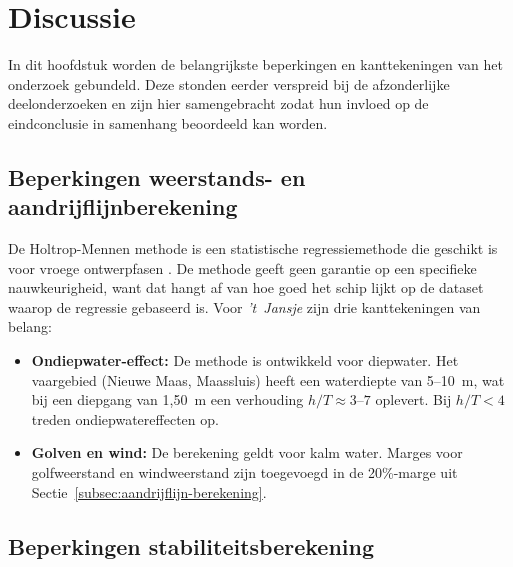 \chapter{Discussie}
\label{ch:discussie}

\noindent In dit hoofdstuk worden de belangrijkste beperkingen en kanttekeningen
van het onderzoek gebundeld. Deze stonden eerder verspreid bij de afzonderlijke
deelonderzoeken en zijn hier samengebracht zodat hun invloed op de eindconclusie
in samenhang beoordeeld kan worden.

\section{Beperkingen weerstands- en aandrijflijnberekening}
\label{subsec:holtrop-validatie}

De Holtrop-Mennen methode is een statistische regressiemethode die
geschikt is voor vroege ontwerpfasen \cite{Holtrop1984}. De methode
geeft geen garantie op een specifieke nauwkeurigheid, want dat hangt
af van hoe goed het schip lijkt op de dataset waarop de regressie
gebaseerd is. Voor \emph{'t~Jansje} zijn drie kanttekeningen van belang:

\begin{itemize}

    \item \textbf{Ondiepwater-effect:} De methode is ontwikkeld voor diepwater.
          Het vaargebied (Nieuwe Maas, Maassluis) heeft een waterdiepte van
          5--10~m, wat bij een diepgang van 1{,}50~m een verhouding
          $h/T \approx 3$--$7$ oplevert. Bij $h/T < 4$ treden
          ondiepwatereffecten op.

    \item \textbf{Golven en wind:} De berekening geldt voor kalm water. Marges
          voor golfweerstand en windweerstand zijn toegevoegd in de
          20\%-marge uit Sectie~\ref{subsec:aandrijflijn-berekening}.
\end{itemize}

\section{Beperkingen stabiliteitsberekening}
\label{sec:stab_beperkingen}

